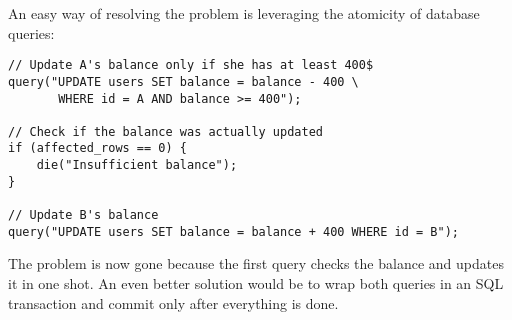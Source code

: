 An easy way of resolving the problem is leveraging the atomicity of database queries:

\begin{verbatim}
// Update A's balance only if she has at least 400$
query("UPDATE users SET balance = balance - 400 \
       WHERE id = A AND balance >= 400");

// Check if the balance was actually updated
if (affected_rows == 0) {
    die("Insufficient balance");
}

// Update B's balance
query("UPDATE users SET balance = balance + 400 WHERE id = B");
\end{verbatim}

\noindent
The problem is now gone because the first query checks the balance and updates it in one shot. An even better solution would be to wrap both queries in an SQL transaction and commit only after everything is done.
